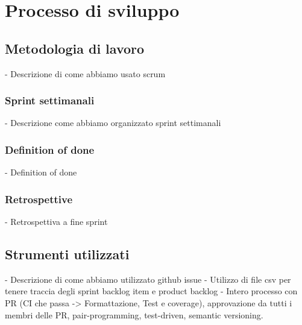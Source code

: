 \chapter{Processo di sviluppo}\label{ch:processo-di-sviluppo}
\section{Metodologia di lavoro}\label{sec:metodologia-di-lavoro}
- Descrizione di come abbiamo usato scrum
\subsection{Sprint settimanali}\label{subsec:sprint-settimanali}
- Descrizione come abbiamo organizzato sprint settimanali
\subsection{Definition of done}\label{subsec:definition-of-done}
- Definition of done
\subsection{Retrospettive}\label{subsec:retrospettive}
- Retrospettiva a fine sprint
\section{Strumenti utilizzati}\label{sec:strumenti-utilizzati}
- Descrizione di come abbiamo utilizzato github issue
- Utilizzo di file csv per tenere traccia degli sprint backlog item e product backlog
- Intero processo con PR (CI che passa -> Formattazione, Test e coverage), approvazione da tutti i membri delle PR, pair-programming, test-driven, semantic versioning.
